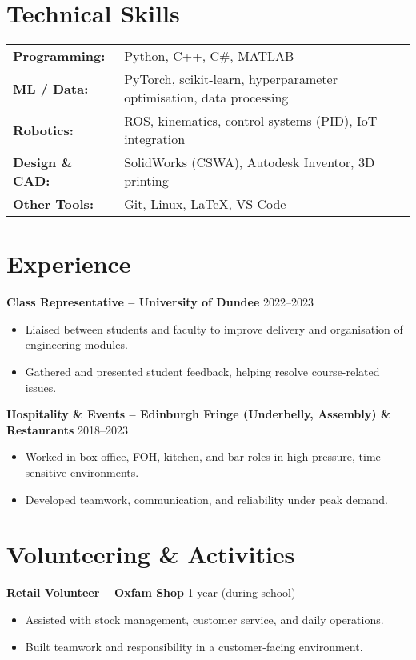 \documentclass[a4paper,11pt]{article}
\begin{document}
\section*{Technical Skills}

\begin{tabular}{@{}ll}
\textbf{Programming:} & Python, C++, C\#, MATLAB \\
\textbf{ML / Data:} & PyTorch, scikit-learn, hyperparameter optimisation, data processing \\
\textbf{Robotics:} & ROS, kinematics, control systems (PID), IoT integration \\
\textbf{Design \& CAD:} & SolidWorks (CSWA), Autodesk Inventor, 3D printing \\
\textbf{Other Tools:} & Git, Linux, LaTeX, VS Code
\end{tabular}

\section*{Experience}

\textbf{Class Representative – University of Dundee} \hfill 2022--2023
\begin{itemize}
    \item Liaised between students and faculty to improve delivery and organisation of engineering modules.
    \item Gathered and presented student feedback, helping resolve course-related issues.
\end{itemize}

\textbf{Hospitality \& Events – Edinburgh Fringe (Underbelly, Assembly) \& Restaurants} \hfill 2018--2023
\begin{itemize}
    \item Worked in box-office, FOH, kitchen, and bar roles in high-pressure, time-sensitive environments.
    \item Developed teamwork, communication, and reliability under peak demand.
\end{itemize}

\section*{Volunteering \& Activities}

\textbf{Retail Volunteer – Oxfam Shop} \hfill 1 year (during school)
\begin{itemize}
    \item Assisted with stock management, customer service, and daily operations.
    \item Built teamwork and responsibility in a customer-facing environment.
\end{itemize}
\end{document}
